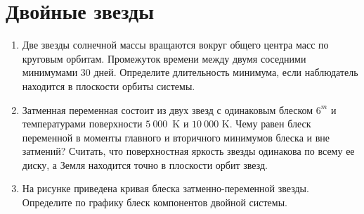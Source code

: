 \documentclass[12pt]{article}
\begin{document}
\section*{Двойные звезды}
\begin{enumerate}[resume]
    \item Две звезды солнечной массы вращаются вокруг общего центра масс по круговым орбитам. Промежуток времени между двумя соседними минимумами $30$ дней. Определите длительность минимума, если наблюдатель находится в плоскости орбиты системы.
    \item Затменная переменная состоит из двух звезд с одинаковым блеском $6^m$ и температурами
	поверхности $5~000$~K и $10~000$ K. Чему равен блеск переменной в моменты главного и вторичного минимумов блеска и вне затмений? Считать, что поверхностная яркость звезды одинакова по всему ее диску, а Земля находится точно в плоскости орбит звезд.
    \item На рисунке приведена кривая блеска  затменно-переменной звезды. Определите по графику блеск компонентов двойной системы.

    \begin{figure}[h] 	
        \centering
\end{figure}
\end{enumerate}
\end{document}
